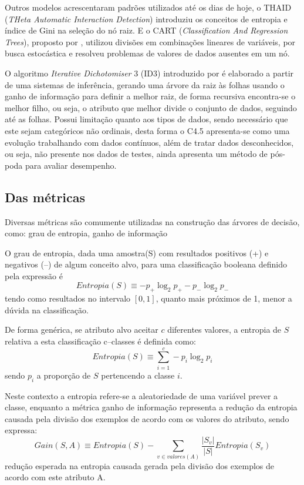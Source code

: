 \documentclass[12pt]{article}
\begin{document}
Outros modelos acrescentaram padrões utilizados até os dias de hoje, o THAID (\emph{THeta Automatic Interaction Detection}) \cite{Messenger1972} introduziu os conceitos de entropia e índice de Gini na seleção do nó raiz. E o CART (\emph{Classification And Regression Trees}), proposto por \cite{Breiman1984}, utilizou divisões em combinações lineares de variáveis, por busca estocástica e resolveu problemas de valores de dados ausentes em um nó.

O algoritmo  \textit{Iterative Dichotomiser} 3 (ID3) introduzido  por  \cite{quinlan1986} é elaborado a partir de uma sistemas de inferência, gerando uma árvore da raiz às folhas usando o ganho de informação para definir a melhor raiz, de forma recursiva encontra-se o melhor filho, ou seja, o atributo que melhor divide o conjunto de dados, seguindo até as folhas. Possui limitação quanto aos tipos de dados, sendo necessário que este sejam categóricos não ordinais, desta forma o C4.5 apresenta-se como uma evolução trabalhando com dados contínuos, além de tratar dados desconhecidos, ou seja, não presente nos dados de testes, ainda apresenta um método de pós-poda para avaliar desempenho.

\subsection{Das métricas}

Diversas métricas são comumente utilizadas na construção das árvores de decisão, como: grau de entropia, ganho de informação

O grau de entropia, dada uma amostra(S) com resultados positivos (+) e negativos (–) de algum conceito alvo, para uma classificação booleana definido pela expressão é
\begin{equation}
    Entropia(S) \equiv -p_+ \log_2 p_+ - p_- \log_2 p_-
\end{equation}
tendo como resultados no intervalo $[0,1]$, quanto mais próximos de 1, menor a dúvida na classificação.

De forma genérica, se atributo alvo aceitar $c$ diferentes valores, a entropia de $S$ relativa a esta classificação c–classes é definida como:
\begin{equation}
    Entropia(S) \equiv \sum_{i=1}^{c} -p_i \log_2 p_i
\end{equation}
sendo $p_i$ a proporção de $S$ pertencendo a classe $i$.

Neste contexto a entropia refere-se a aleatoriedade de uma variável prever a classe,  enquanto a métrica ganho de informação representa a redução da entropia causada pela divisão dos exemplos de acordo com os valores do atributo, sendo expressa:
\begin{equation}
    Gain(S,A) \equiv Entropia(S) - \sum_{v \in valores(A)} \frac{|S_v|}{|S|} Entropia(S_v)
\end{equation}
redução esperada na entropia causada gerada pela divisão dos exemplos de acordo com este atributo A.
\end{document}
